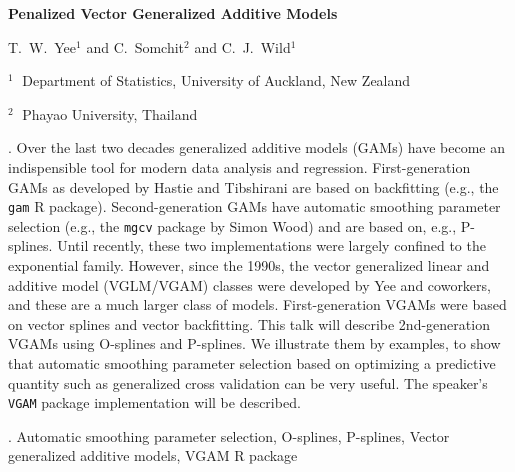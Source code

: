 \documentclass[12pt]{article}
\begin{document}
\begin{flushleft}


{\LARGE\bf Penalized Vector Generalized Additive Models}


\vspace{1.0cm}

T.~W.~Yee$^1$ and C.~Somchit$^2$
and C.~J.~Wild$^1$

\begin{description}

\item $^1 \;$ Department of Statistics,
University of Auckland,
New Zealand

\item $^2 \;$ Phayao University, Thailand

\end{description}

\end{flushleft}


\vspace{0.75cm}

.
Over the last two decades generalized additive
models (GAMs) have become an indispensible tool for modern data
analysis and regression. First-generation GAMs as developed by
Hastie and Tibshirani are based on backfitting (e.g., the \texttt{gam} R
package). Second-generation GAMs have automatic smoothing parameter
selection (e.g., the \texttt{mgcv} package by Simon Wood) and are based
on, e.g., P-splines. Until recently, these two implementations
were largely confined to the exponential family. However, since
the 1990s, the vector generalized linear and additive model
(VGLM/VGAM) classes were developed by Yee and coworkers, and these
are a much larger class of models. First-generation VGAMs were
based on vector splines and vector backfitting. This talk will
describe 2nd-generation VGAMs using O-splines and P-splines. We
illustrate them by examples, to show that automatic smoothing
parameter selection based on optimizing a predictive quantity such
as generalized cross validation can be very useful.  The speaker's
\texttt{VGAM} package implementation will be described.


\vskip 2mm

.
Automatic smoothing parameter selection,
O-splines,
P-splines,
Vector generalized additive models,
VGAM R package
\end{document}
